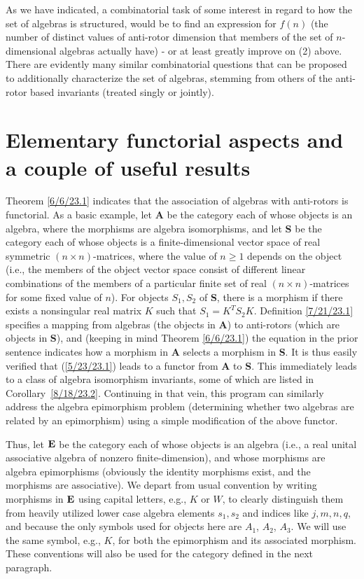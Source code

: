\documentclass{amsart}
\numberwithin{equation}{section}
\theoremstyle{definition}
\numberwithin{theorem}{section}
\begin{document}
  \medskip
  
As we have indicated, a combinatorial task of some interest in regard to how the set of algebras is structured, would be to find an expression for $f(n)$ (the number of distinct values of anti-rotor dimension that members of the set of $n$-dimensional algebras actually have) - or at least greatly improve on (2) above.   
There are evidently many similar combinatorial questions that can be proposed to additionally characterize the set of algebras, stemming from others of the anti-rotor based invariants (treated singly or jointly).

\section{Elementary functorial aspects and a couple of useful results}
 Theorem \ref{6/6/23.1} indicates that the association of algebras with anti-rotors is functorial.  As a basic example, let {\bf A} be the category each of whose objects is an algebra, where the morphisms are algebra isomorphisms, and let {\bf S} be the category each of whose objects is a finite-dimensional vector space of real symmetric $(n\times n)$-matrices, where the value of $n\ge 1$ depends on the object (i.e., the members of the object vector space consist of different linear combinations of the members of a particular finite set of real $(n\times n)$-matrices for some fixed value of $n$).  For objects $S_1,S_2$ of {\bf S}, there is a morphism if there exists a nonsingular real matrix $K$ such that \mbox{$S_1  = K^T  S_2 K$.}    Definition \ref{7/21/23.1} specifies a mapping from algebras (the objects in {\bf A}) to anti-rotors (which are objects in {\bf S}), and (keeping in mind Theorem \ref{6/6/23.1}) the equation in the prior sentence indicates how a morphism in {\bf A} selects a morphism in {\bf S}.  It is thus easily verified that (\ref{5/23/23.1}) leads to a functor from {\bf A} to {\bf S}.  This immediately leads to a class of algebra isomorphism invariants, some of which are listed in  \mbox{Corollary \ref{8/18/23.2}}.
Continuing in that vein, this program can similarly address the algebra epimorphism problem (determining whether two algebras are related by an epimorphism) using a simple modification of the above functor.  

Thus, let ${\bf E}$ be the category each of whose objects is an algebra (i.e., a real unital associative algebra of nonzero finite-dimension), and whose morphisms are algebra epimorphisms (obviously the identity morphisms exist, and the morphisms are associative).   We depart from usual convention by writing morphisms in ${\bf E}$ using capital letters, e.g., $K$ or $W$, to clearly distinguish them from heavily utilized lower case algebra elements $s_1,s_2$ and indices like $j,m,n,q$, and because the only symbols used for objects here are $A_1$, $A_2$, $A_3$. We will use the same symbol, e.g., $K$, for both the epimorphism and its associated morphism. These conventions will also be used for the category defined in the next paragraph.   
\end{document}

